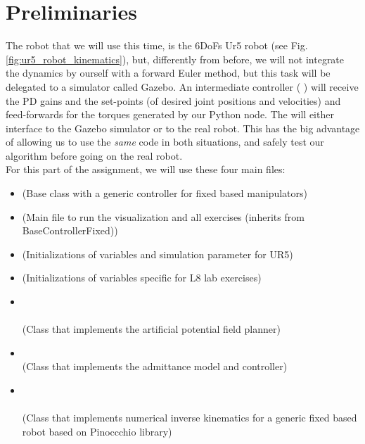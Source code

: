 \documentclass[11pt]{article}
\begin{document}
\section{Preliminaries}
	The robot that we will use this time, is the  6DoFs Ur5 robot (see Fig. \ref{fig:ur5_robot_kinematics}), but, differently from before, we will not integrate the dynamics by ourself with a forward Euler method,  but this task will be delegated to a simulator called Gazebo. An intermediate controller ( ) will receive the PD gains and the set-points (of desired joint positions and velocities) and feed-forwards for the torques generated by our Python node.
	The   will either interface to the  Gazebo simulator or to the real robot. This has the big advantage of  allowing us to use the \textit{same} code in both situations, and safely test our algorithm before going on the real robot.\\
	
	
	For this part of the assignment, we will use these four main files: 
	\begin{itemize}
		\item {} (Base class with a generic controller for fixed based manipulators)
		\item {} (Main file to run the visualization and all exercises (inherits from BaseControllerFixed))
		\item {} (Initializations of variables and simulation parameter for UR5)
		\item {} (Initializations of variables specific for L8 lab exercises)
        \item {} \\        	
        	   \\(Class that implements the artificial potential field planner)
        \item {}\\ (Class that implements the admittance model and controller)
        \item {}\\        	
        	 \\(Class that implements numerical inverse kinematics for a generic fixed based robot based on Pinoccchio library)
	\end{itemize}
	
\end{document}
